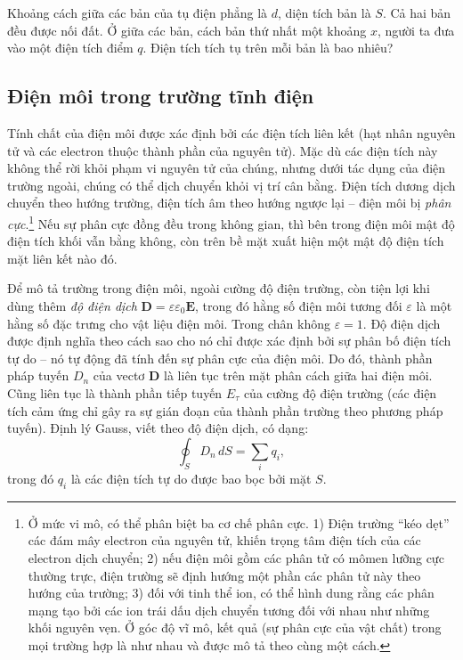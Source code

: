 
 Khoảng cách giữa các bản của tụ điện phẳng là $d$, diện tích bản là $S$. Cả hai bản đều được nối đất. Ở giữa các bản, cách bản thứ nhất một khoảng $x$, người ta đưa vào một điện tích điểm $q$. Điện tích tích tụ trên mỗi bản là bao nhiêu?


\subsection{Điện môi trong trường tĩnh điện}

Tính chất của điện môi được xác định bởi các điện tích liên kết (hạt nhân nguyên tử và các electron thuộc thành phần của nguyên tử). Mặc dù các điện tích này không thể rời khỏi phạm vi nguyên tử của chúng, nhưng dưới tác dụng của điện trường ngoài, chúng có thể dịch chuyển khỏi vị trí cân bằng. Điện tích dương dịch chuyển theo hướng trường, điện tích âm theo hướng ngược lại -- điện môi bị \emph{phân cực}.\footnote{Ở mức vi mô, có thể phân biệt ba cơ chế phân cực. 1) Điện trường ``kéo dẹt'' các đám mây electron của nguyên tử, khiến trọng tâm điện tích của các electron dịch chuyển; 2) nếu điện môi gồm các phân tử có mômen lưỡng cực thường trực, điện trường sẽ định hướng một phần các phân tử này theo hướng của trường; 3) đối với tinh thể ion, có thể hình dung rằng các phân mạng tạo bởi các ion trái dấu dịch chuyển tương đối với nhau như những khối nguyên vẹn. Ở góc độ vĩ mô, kết quả (sự phân cực của vật chất) trong mọi trường hợp là như nhau và được mô tả theo cùng một cách.} Nếu sự phân cực đồng đều trong không gian, thì bên trong điện môi mật độ điện tích khối vẫn bằng không, còn trên bề mặt xuất hiện một mật độ điện tích mặt liên kết nào đó.

Để mô tả trường trong điện môi, ngoài cường độ điện trường, còn tiện lợi khi dùng thêm \emph{độ điện dịch} $\mathbf{D} = \varepsilon\varepsilon_0\mathbf{E}$, trong đó hằng số điện môi tương đối $\varepsilon$ là một hằng số đặc trưng cho vật liệu điện môi. Trong chân không $\varepsilon=1$. Độ điện dịch được định nghĩa theo cách sao cho nó chỉ được xác định bởi sự phân bố điện tích tự do -- nó tự động đã tính đến sự phân cực của điện môi. Do đó, thành phần pháp tuyến $D_n$ của vectơ $\mathbf{D}$ là liên tục trên mặt phân cách giữa hai điện môi. Cũng liên tục là thành phần tiếp tuyến $E_\tau$ của cường độ điện trường (các điện tích cảm ứng chỉ gây ra sự gián đoạn của thành phần trường theo phương pháp tuyến). Định lý Gauss, viết theo độ điện dịch, có dạng:
\[
\oint_S D_n\,dS = \sum_i q_i,
\]
trong đó $q_i$ là các điện tích tự do được bao bọc bởi mặt $S$.

